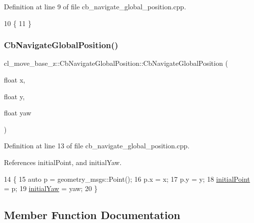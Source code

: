 Definition at line 9 of file cb\+\_\+navigate\+\_\+global\+\_\+position.\+cpp.


\begin{DoxyCode}
10 \{
11 \}
\end{DoxyCode}
\mbox{\label{classcl__move__base__z_1_1CbNavigateGlobalPosition_a79d42c0eeee48af5e73d917fa2d5b4f5}} 
\subsubsection{\texorpdfstring{Cb\+Navigate\+Global\+Position()}{CbNavigateGlobalPosition()}\hspace{0.1cm}{\footnotesize\ttfamily [2/2]}}
{\footnotesize\ttfamily cl\+\_\+move\+\_\+base\+\_\+z\+::\+Cb\+Navigate\+Global\+Position\+::\+Cb\+Navigate\+Global\+Position (\begin{DoxyParamCaption}\item[{float}]{x,  }\item[{float}]{y,  }\item[{float}]{yaw }\end{DoxyParamCaption})}



Definition at line 13 of file cb\+\_\+navigate\+\_\+global\+\_\+position.\+cpp.



References initial\+Point, and initial\+Yaw.


\begin{DoxyCode}
14 \{
15     \textcolor{keyword}{auto} p = geometry\_msgs::Point();
16     p.x = x;
17     p.y = y;
18     \hyperlink{classcl__move__base__z_1_1CbNavigateGlobalPosition_afc5b0337f06dc4c51026e0c0646b8645}{initialPoint} = p;
19     \hyperlink{classcl__move__base__z_1_1CbNavigateGlobalPosition_a09f1cf00473ae1f90b974f49a1c31086}{initialYaw} = yaw;
20 \}
\end{DoxyCode}


\subsection{Member Function Documentation}
\mbox{\label{classcl__move__base__z_1_1CbNavigateGlobalPosition_a489aaab9282dea9253fcf6b02e5f8aa4}} 
